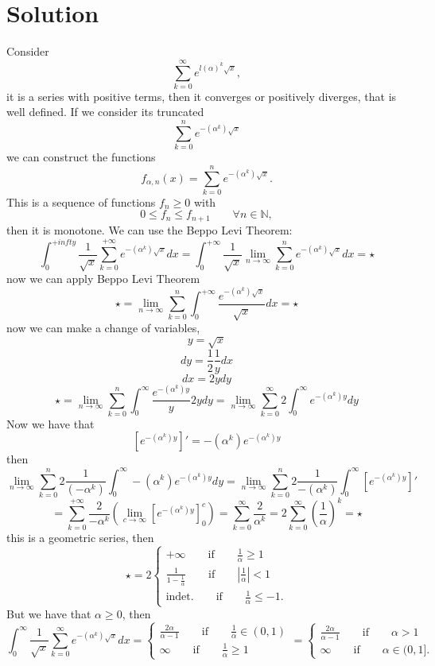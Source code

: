 \documentclass[a4paper, twoside, openany]{book}
\begin{document}
\section*{Solution}
Consider
$$\sum_{k = 0}^{\infty} e^{l(\alpha)^k \sqrt{x}},$$
it is a series with positive terms, then it converges or positively diverges, that is well defined. If we consider its truncated
$$\sum_{k = 0}^n e^{-(\alpha^k) \sqrt{x}}$$
we can construct the functions
$$f_{\alpha, n} (x) = \sum_{k = 0}^n e^{-(\alpha^k)\sqrt{x}}.$$
This is a sequence of functions $f_n \geq 0$ with
$$0 \leq f_n \leq f_{n+1} \qquad \forall n \in \mathbb{N},$$
then it is monotone. We can use the Beppo Levi Theorem:
$$\int_0^{+infty} \frac{1}{\sqrt{x}} \sum_{k = 0}^{+\infty} e^{-(\alpha^k)\sqrt{x}} dx = \int_0^{+\infty} \frac{1}{\sqrt{x}} \lim_{n \rightarrow \infty} \sum_{k = 0}^n e^{-(\alpha^k)\sqrt{x}} dx = \star$$
now we can apply Beppo Levi Theorem
$$\star = \lim_{n \rightarrow \infty} \sum_{k = 0}^n \int_0^{+\infty} \frac{e^{-(\alpha^k)\sqrt{x}}}{\sqrt{x}} dx = \star$$
now we can make a change of variables,
$$y = \sqrt{x}$$
$$dy = \frac{1}{2} \frac{1}{y} dx$$
$$dx = 2 y dy$$
$$\star = \lim_{n \rightarrow \infty} \sum_{k = 0}^n \int_0^{\infty} \frac{e^{-(\alpha^k) y}}{y} 2 y dy = \lim_{n \rightarrow \infty} \sum_{k = 0}^{\infty} 2 \int_0^{\infty} e^{-(\alpha^k) y} dy$$
Now we have that
$$[e^{-(\alpha^k)y}]' = -(\alpha^k) e^{-(\alpha^k)y}$$
then
$$\lim_{n \rightarrow \infty} \sum_{k = 0}^n 2 \frac{1}{(-\alpha^k)} \int_0^{\infty} -(\alpha^k)e^{-(\alpha^k)y} dy = \lim_{n \rightarrow \infty} \sum_{k=0}^n 2 \frac{1}{-(\alpha^k)}\int_0^{\infty} [e^{-(\alpha^k)y}]'$$
$$ = \sum_{k = 0}^{+\infty} \frac{2}{-\alpha^k} (\lim_{c \rightarrow \infty} [e^{-(\alpha^k)y}]_0^c) = \sum_{k=0}^{\infty} \frac{2}{\alpha^k} = 2 \sum_{k=0}^{\infty}(\frac{1}{\alpha})^k= \star$$
this is a geometric series, then
$$\star = 2 \begin{cases}
				+\infty \qquad \textrm{if} \qquad \frac{1}{\alpha} \geq 1 \\
				\frac{1}{1 - \frac{1}{\alpha}} \qquad \textrm{if} \qquad |\frac{1}{\alpha}| < 1 \\
				\textrm{indet.} \qquad \textrm{if} \qquad \frac{1}{\alpha} \leq -1.
			\end{cases}$$
But we have that $\alpha \geq 0$, then
$$\int_0^{\infty} \frac{1}{\sqrt{x}} \sum_{k=0}^{\infty} e^{-(\alpha^k)\sqrt{x}} dx = \begin{cases}
		\frac{2 \alpha}{\alpha - 1} \qquad \textrm{if} \qquad \frac{1}{\alpha} \in (0, 1) \\
		\infty \qquad \textrm{if} \qquad \frac{1}{\alpha} \geq 1	 
	 \end{cases} = \begin{cases}
		\frac{2 \alpha}{\alpha - 1} \qquad \textrm{if} \qquad \alpha > 1 \\
		\infty \qquad \textrm{if} \qquad \alpha \in (0, 1].	 
	 \end{cases}$$
\clearpage
\end{document}
